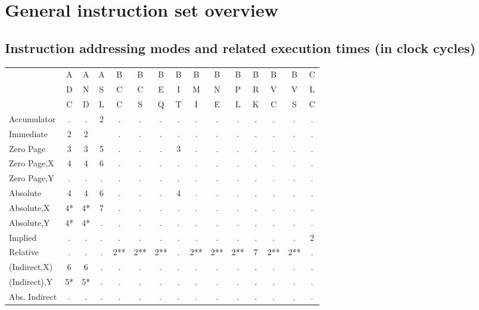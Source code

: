 \documentclass{article}
\begin{document}
  \section{General instruction set overview}
  \subsection{Instruction addressing modes and related execution times (in clock cycles)}
  \begin{table}[H]
  \centering
  \begin{tabular}{|l|c c c c c c c c c c c c c c|}
  \hline
               &  A & A & A & B & B & B & B & B & B & B & B & B & B & C\\
               &  D & N & S & C & C & E & I & M & N & P & R & V & V & L\\
               &  C & D & L & C & S & Q & T & I & E & L & K & C & S & C\\
  \hline
  Accumulator  &  . & . & 2 & . & . & . & . & . & . & . & . & . & . & .\\
  Immediate    &  2 & 2 &  &  . & . & . & . & . & . & . & . & . & . & .\\
  Zero Page    &  3 & 3 & 5 & . & . & . & 3 & . & . & . & . & . & . & .\\
  Zero Page,X  &  4 & 4 & 6 & . & . & . & . & . & . & . & . & . & . & .\\
  Zero Page,Y  &  . & . & . & . & . & . & . & . & . & . & . & . & . & .\\
  Absolute     &  4 & 4 & 6 & . & . & . & 4 & . & . & . & . & . & . & .\\
  Absolute,X   &  4*& 4*& 7 & . & . & . & . & . & . & . & . & . & . & .\\
  Absolute,Y   &  4*& 4*& . & . & . & . & . & . & . & . & . & . & . & .\\
  Implied      &  . & . & . & . & . & . & . & . & . & . & . & . & . & 2\\
  Relative     &  . & . & . & 2**&2**&2**&. & 2**&2**&2**&7 & 2**&2**&.\\
  (Indirect,X) &  6 & 6 & . & . & . & . & . & . & . & . & . & . & . & .\\
  (Indirect),Y &  5*& 5*& . & . & . & . & . & . & . & . & . & . & . & .\\
  Abs. Indirect&  . & . & . & . & . & . & . & . & . & . & . & . & . & .\\
  \hline
  \end{tabular}
  \end{table}
  
\end{document}
